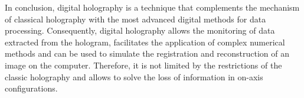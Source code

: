 \documentclass[12pt]{article}
\begin{document}
In conclusion, digital holography is a technique that complements the mechanism of classical holography with the most advanced digital methods for data processing. Consequently, digital holography allows the monitoring of data extracted from the hologram, facilitates the application of complex numerical methods and can be used to simulate the registration and reconstruction of an image on the computer. Therefore, it is not limited by the restrictions of the classic holography and allows to solve the loss of information in on-axis configurations.


\end{document}
